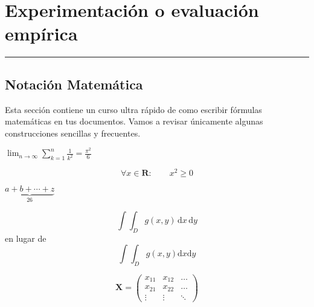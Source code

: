 \chapter{Experimentación o evaluación empírica}
\hrule \bigskip \vspace*{1cm}

\section{Notación Matemática}

Esta sección contiene un curso ultra rápido de como escribir
fórmulas matemáticas en tus documentos. Vamos a revisar únicamente
algunas construcciones sencillas y frecuentes.

$\lim_{n \to \infty} \sum_{k=1}^n \frac{1}{k^2} = \frac{\pi^2}{6}$

\begin{equation}
\forall x \in \mathbf{R}: \qquad x^{2} \geq 0
\end{equation}

$\underbrace{ a+b+\cdots+z }_{26}$

\newcommand{\rd}{\mathrm{d}}
\begin{displaymath}
\int\!\!\!\int_{D} g(x,y) \, \rd x\, \rd y
\end{displaymath}
en lugar de
\begin{displaymath}
\int\int_{D} g(x,y)\rd x \rd y
\end{displaymath}


\begin{displaymath}
\mathbf{X} = \left( \begin{array}{ccc}
x_{11} & x_{12} & \ldots \\
x_{21} & x_{22} & \ldots \\
\vdots & \vdots & \ddots
\end{array} \right)
\end{displaymath}
